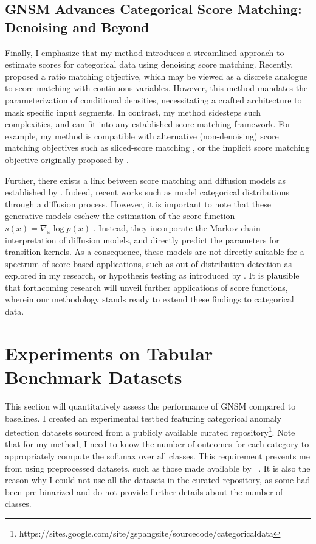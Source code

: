 \subsection*{GNSM Advances Categorical Score Matching: Denoising and Beyond}

Finally, I emphasize that my method introduces a streamlined approach to estimate scores for categorical data using denoising score matching. Recently, \cite{sun2023scorebased} proposed a ratio matching objective, which may be viewed as a discrete analogue to score matching with continuous variables. However, this method mandates the parameterization of conditional densities, necessitating a crafted architecture to mask specific input segments. In contrast, my method sidesteps such complexities, and can fit into any established score matching framework. For example, my method is compatible with alternative (non-denoising) score matching objectives such as sliced-score matching \cite{song2020sliced}, or the implicit score matching objective originally proposed by \cite{hyvarinen2005}.

Further, there exists a link between score matching and diffusion models as established by \cite{song2020score}. Indeed, recent works such as \cite{structured, argmax} model categorical distributions through a diffusion process. However, it is important to note that these generative models eschew the estimation of the score function $s(x) = \nabla_x \log p(x)$ . Instead, they incorporate the Markov chain interpretation of diffusion models, and directly predict the parameters for transition kernels. As a consequence, these models are not directly suitable for a spectrum of score-based applications, such as out-of-distribution detection as explored in my research, or hypothesis testing as introduced by \cite{hypothesis}. It is plausible that forthcoming research will unveil further applications of score functions, wherein our methodology stands ready to extend these findings to categorical data. 

\section{Experiments on Tabular Benchmark Datasets}\label{sec:gnsm_experiments}

This section will quantitatively assess the performance of GNSM compared to baselines. I created an experimental testbed featuring categorical anomaly detection datasets sourced from a publicly available curated repository\footnote{\scriptsize https://sites.google.com/site/gspangsite/sourcecode/categoricaldata}. Note that for my method, I need to know the number of outcomes for each category to appropriately compute the softmax over all classes. This requirement prevents me from using preprocessed datasets, such as those made available by ~\cite{han2022adbench}. It is also the reason why I could not use all the datasets in the curated repository, as some had been pre-binarized and do not provide further details about the number of classes.

